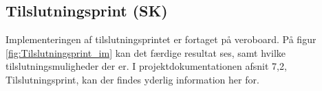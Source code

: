 \subsection{Tilslutningsprint (SK)}

Implementeringen af tilslutningsprintet er fortaget på veroboard. På figur \ref{fig:Tilslutningsprint_im} kan det færdige resultat ses, samt hvilke tilslutningsmuligheder der er. I projektdokumentationen afsnit 7,2, Tilslutningsprint, kan der findes yderlig information her for.  



